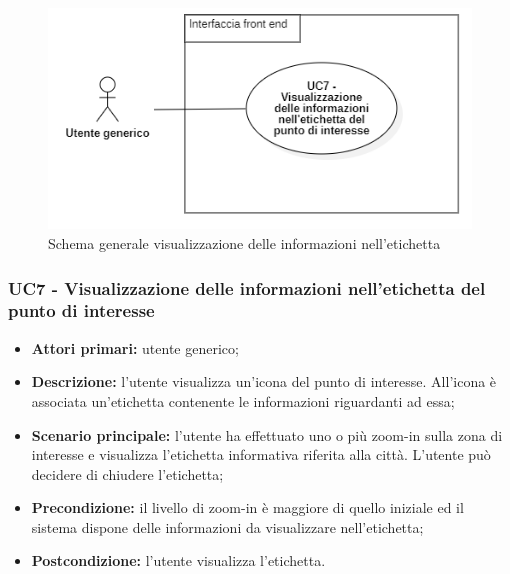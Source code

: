 \begin{center}
	\begin{figure}[H]
		\centering\includegraphics[scale=0.8]{../immagini/attori_casi/UC_7.png}
		\caption{Schema generale visualizzazione delle informazioni nell'etichetta}
	\end{figure}
\end{center}


\subsubsection{UC7 - Visualizzazione delle informazioni nell'etichetta del punto di interesse}\label{CasiDUsoCasiDUsoTraUnUtenteEIlFrontEndElencoCasiDUsoUC312VisualizzazioneDelPopupDiUnPuntoDiInteresse}

\begin{itemize}
	\item \textbf{Attori primari:} utente generico;
	\item \textbf{Descrizione:} l’utente visualizza un'icona del punto di interesse. All'icona è associata un'etichetta contenente le informazioni riguardanti ad essa;
	\item \textbf{Scenario principale:} l’utente ha effettuato uno o più zoom-in sulla zona di interesse e visualizza l'etichetta informativa riferita alla città. L'utente può decidere di chiudere l'etichetta;
	\item \textbf{Precondizione:} il livello di zoom-in è maggiore di quello iniziale ed il sistema dispone delle informazioni da visualizzare nell'etichetta;
	\item \textbf{Postcondizione:} l’utente visualizza l'etichetta.
\end{itemize}

